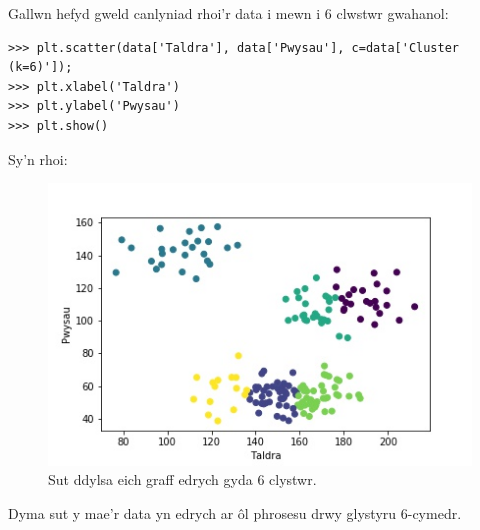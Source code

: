 Gallwn hefyd gweld canlyniad rhoi'r data i mewn i 6 clwstwr gwahanol: 

\begin{verbatim}
>>> plt.scatter(data['Taldra'], data['Pwysau'], c=data['Cluster (k=6)']);
>>> plt.xlabel('Taldra')
>>> plt.ylabel('Pwysau')
>>> plt.show()
\end{verbatim}

Sy'n rhoi:

\begin{figure}[H]
\begin{center}
\includegraphics[width=0.7\linewidth]{../img/6clystwrpython.jpeg}
\caption{Sut ddylsa eich graff edrych gyda 6 clystwr.}
\label{fig:6clystwrpython}
\end{center}
\end{figure}

Dyma sut y mae'r data yn edrych ar \^{o}l phrosesu drwy glystyru 6-cymedr. 